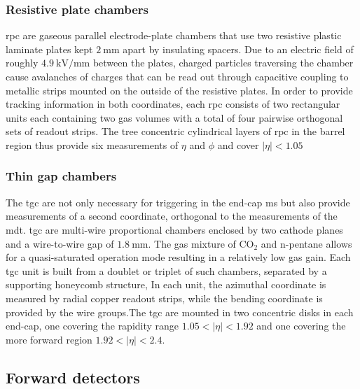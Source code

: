 \subsubsection{Resistive plate chambers}

\gls{rpc} are gaseous parallel electrode-plate chambers that use two resistive plastic laminate plates kept $\SI{2}{\milli\meter}$ apart by insulating spacers. Due to an electric field of roughly $\SI{4.9}{\kilo\volt\per\milli\meter}$ between the plates, charged particles traversing the chamber cause avalanches of charges that can be read out through capacitive coupling to metallic strips mounted on the outside of the resistive plates. In order to provide tracking information in both coordinates, each \gls{rpc} consists of two rectangular units each containing two gas volumes with a total of four pairwise orthogonal sets of readout strips. The tree concentric cylindrical layers of \gls{rpc} in the barrel region thus provide six measurements of $\eta$ and $\phi$ and cover $\vert\eta\vert <1.05$

\subsubsection{Thin gap chambers}

The \gls{tgc} are not only necessary for triggering in the end-cap \gls{ms} but also provide measurements of a second coordinate, orthogonal to the measurements of the \gls{mdt}. \gls{tgc} are multi-wire proportional chambers enclosed by two cathode planes and a wire-to-wire gap of $\SI{1.8}{\milli\meter}$. The gas mixture of CO$_2$ and n-pentane allows for a quasi-saturated operation mode resulting in a relatively low gas gain. Each \gls{tgc} unit is built from a doublet or triplet of such chambers, separated by a supporting honeycomb structure, In each unit, the azimuthal coordinate is measured by radial copper readout strips, while the bending coordinate is provided by the wire groups.The \gls{tgc} are mounted in two concentric disks in each end-cap, one covering the rapidity range $1.05 < \vert\eta\vert < 1.92$ and one covering the more forward region $1.92 < \vert\eta\vert <2.4$. 

\subsection{Forward detectors}

